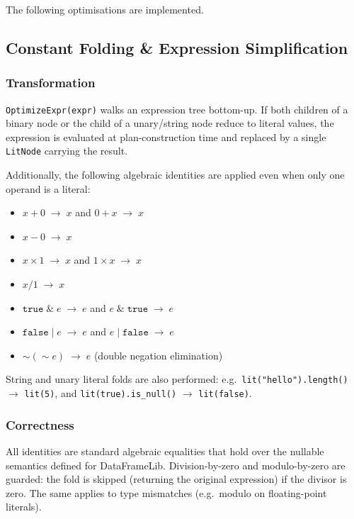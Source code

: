 \documentclass[12pt,a4paper]{article}
\begin{document}
The following optimisations are implemented.

\subsection{Constant Folding \& Expression Simplification}

\subsubsection*{Transformation}

\texttt{OptimizeExpr(expr)} walks an expression tree bottom-up.  If both
children of a binary node or the child of a unary/string node reduce to
literal values, the expression is evaluated at plan-construction time and
replaced by a single \texttt{LitNode} carrying the result.

Additionally, the following algebraic identities are applied even when only
one operand is a literal:

\begin{itemize}[leftmargin=1.5em]
  \item $x + 0 \;\to\; x$ \quad and \quad $0 + x \;\to\; x$
  \item $x - 0 \;\to\; x$
  \item $x \times 1 \;\to\; x$ \quad and \quad $1 \times x \;\to\; x$
  \item $x / 1 \;\to\; x$
  \item $\mathtt{true} \;\&\; e \;\to\; e$ \quad and \quad $e \;\&\; \mathtt{true} \;\to\; e$
  \item $\mathtt{false} \;|\; e \;\to\; e$ \quad and \quad $e \;|\; \mathtt{false} \;\to\; e$
  \item $\sim(\sim e) \;\to\; e$ (double negation elimination)
\end{itemize}

String and unary literal folds are also performed: e.g.\
\texttt{lit("hello").length()} $\to$ \texttt{lit(5)}, and
\texttt{lit(true).is\_null()} $\to$ \texttt{lit(false)}.

\subsubsection*{Correctness}

All identities are standard algebraic equalities that hold over the
nullable semantics defined for DataFrameLib.  Division-by-zero and
modulo-by-zero are guarded: the fold is skipped (returning the original
expression) if the divisor is zero.  The same applies to type mismatches
(e.g.\ modulo on floating-point literals).
\end{document}
